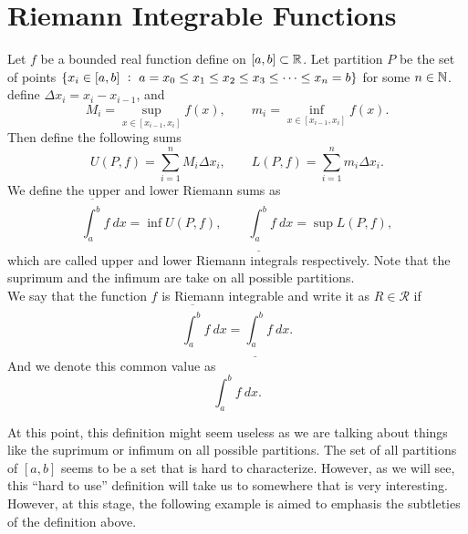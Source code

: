 \section{Riemann Integrable Functions}
\begin{definition}
	Let $f$ be a bounded real function define on $[a,b] \subset \mathbb{R}$. Let partition $P$ be the set of points $\set{x_i \in [a,b]\ :\ a=x_0 \leq x_1\leq x_2\leq x_3\leq \cdots \leq x_n=b}$ for some $n\in \mathbb{N}$. define $\Delta x_i = x_{i} - x_{i-1}$, and
	\[ M_i = \sup_{x\in[x_{i-1},x_{i}]}f(x), \qquad m_i = \inf_{x\in[x_{i-1},x_{i}]}f(x). \]
	Then define the following sums
	\[ U(P,f) = \sum_{i=1}^{n} M_i \Delta x_i, \qquad L(P,f) = \sum_{i=1}^{n}  m_i \Delta x_i.\]
	We define the upper and lower Riemann sums as
	\[ \overline{\int_a^b} f\ dx = \inf U(P,f), \qquad \underline{\int_a^b} f\ dx = \sup L(P,f),
	 \]
	which are called upper and lower Riemann integrals respectively. Note that the suprimum and the infimum are take on all possible partitions. \\
	We say that the function $f$ is Riemann integrable and write it as $R \in\mathcal{R}$ if 
	\[ \overline{\int_a^b} f\ dx = \underline{\int_a^b} f\ dx . \]
	And we denote this common value as
	\[ \int_a^b f\ dx. \]
\end{definition}
At this point, this definition might seem useless as we are talking about things like the suprimum or infimum on all possible partitions. The set of all partitions of $[a,b]$ seems to be a set that is hard to characterize. However, as we will see, this ``hard to use'' definition will take us to somewhere that is very interesting. However, at this stage, the following example is aimed to emphasis the subtleties of the definition above.
